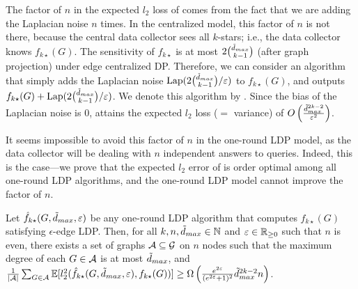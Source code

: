 The factor of $n$ in the 
expected $l_2$ loss 
of 
comes from the fact that we are adding 
the Laplacian noise 
$n$ times. 
In the centralized model, this factor of $n$ is not there, because the central data collector sees all $k$-stars; i.e., the data collector knows $f_{k\star}(G)$. 
The 
sensitivity of $f_{k\star}$ is 
at most $2\binom{\tilde{d}_{max}}{k-1}$ (after graph projection) under edge centralized DP. 
Therefore, we can consider an algorithm that simply adds the Laplacian noise $\textrm{Lap}(2\binom{\tilde{d}_{max}}{k-1}/\varepsilon)$ to $f_{k\star}(G)$, and outputs $f_{k\star}(G) + \textrm{Lap}(2\binom{\tilde{d}_{max}}{k-1}/\varepsilon)$. 
We denote this algorithm by . 
Since the bias of the Laplacian noise is $0$, 
 attains the expected $l_2$ loss ($=$ variance) of $O\left(\frac{\tilde{d}_{max}^{2k-2}}{\varepsilon^2}\right)$. 

It seems impossible to avoid this factor of $n$ in the 
one-round 
LDP model, as the data collector will be dealing with $n$ independent answers to
queries. Indeed, this is the case---we prove that the expected $l_2$ error of  
is order optimal among all 
one-round 
LDP algorithms, and 
the 
one-round 
LDP model cannot
improve 
the factor of $n$.

\begin{corollary}\label{chap1-cor:kstars-lb}
  Let 
  $\hat{f}_{k\star}(G,\tilde{d}_{max},\varepsilon)$
  be any 
  one-round 
  LDP algorithm that 
  computes $f_{k\star}(G)$ satisfying $\epsilon$-edge LDP. Then, for all
  $k,n,\tilde{d}_{max} \in \mathbb{N}$ and $\varepsilon \in \mathbb{R}_{\ge0}$ such that 
  $n$ is even, 
  there exists a set of graphs 
  $\mathcal{A} \subseteq \mathcal{G}$ 
  on $n$ 
  nodes 
  such that 
  the maximum degree of each 
  $G \in \mathcal{A}$ 
  is
  at most $\tilde{d}_{max}$,
  and 
  $\frac{1}{|\mathcal{A}|}\sum_{G \in \mathcal{A}} \operatorname{\mathbb{E}}[l_2^2(\hat{f}_{k\star}(G,\tilde{d}_{max},\varepsilon), f_{k\star}(G))] 
  \geq 
  \Omega\left(\frac{e^{2\varepsilon}}{(e^{2\varepsilon}+1)^2}\tilde{d}_{max}^{2k-2}n \right)$.
\end{corollary}

